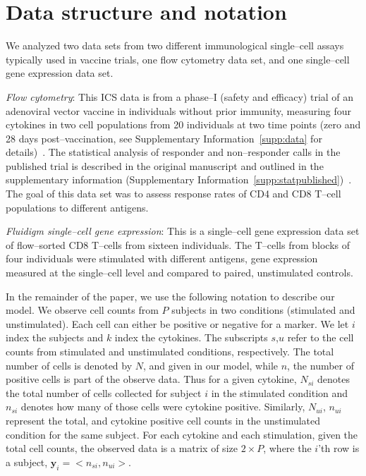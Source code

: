 \documentclass[11pt]{article}
\begin{document}
\section{Data structure and notation} 
We analyzed two data sets from two different immunological single--cell assays typically used in vaccine trials, one flow cytometry data set, and one single--cell gene expression data set.

\textit{Flow cytometry}: This ICS data is from a phase--I (safety and efficacy) trial of an adenoviral vector vaccine in individuals without prior immunity, measuring four cytokines in two cell populations from 20 individuals at two time points (zero and 28 days post--vaccination, see Supplementary Information~\ref{supp:data} for details)~\cite{Peiperl:2010ej}. The statistical analysis of responder and non--responder calls in the published trial is described in the original manuscript and outlined in the supplementary information (Supplementary Information~\ref{supp:statpublished})~\cite{Peiperl:2010ej}. The goal of this data set was to assess response rates of CD4 and CD8 T--cell populations to different antigens.

\textit{Fluidigm single--cell gene expression}: This is a single--cell gene expression data set of flow--sorted CD8 T--cells from sixteen individuals. The T--cells from blocks of four individuals were stimulated with different antigens, gene expression measured at the single--cell level and compared to paired, unstimulated controls. 

In the remainder of the paper, we use the following notation to describe our model. We observe cell counts from $P$ subjects in two conditions (stimulated and unstimulated). Each cell can either be positive or negative for a marker. We let $i$ index the subjects and $k$ index the cytokines. The subscripts $s$,$u$ refer to the cell counts from stimulated and unstimulated conditions, respectively. The total number of cells is denoted by $N$, and given in our model, while $n$, the number of positive cells is part of the observe data. Thus for a given cytokine, $N_{si}$ denotes the total number of cells collected for subject $i$ in the stimulated condition and $n_{si}$ denotes how many of those cells were cytokine positive. Similarly, $N_{ui}$, $n_{ui}$ represent the total, and cytokine positive cell counts in the unstimulated condition for the same subject. For each cytokine and each stimulation, given the total cell counts, the observed data is a matrix of size $2 \times P$, where the $i$'th row is a subject, $\mathbf{y}_i = <n_{si},n_{ui}>$. 
\end{document}
